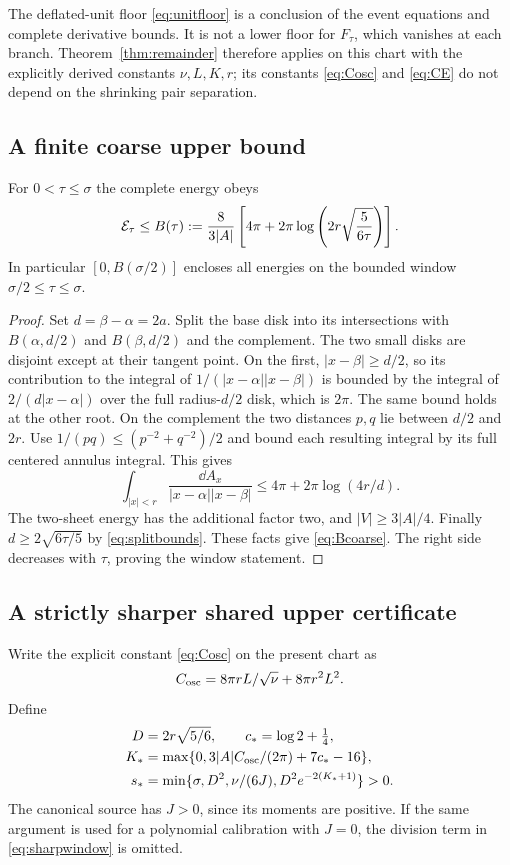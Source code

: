 The deflated-unit floor \eqref{eq:unitfloor} is a conclusion of the
event equations and complete derivative bounds. It is not a lower floor
for $F_\tau$, which vanishes at each branch. Theorem~\ref{thm:remainder}
therefore applies on this chart with the explicitly derived constants
$\nu,L,K,r$; its constants \eqref{eq:Cosc} and \eqref{eq:CE} do not
depend on the shrinking pair separation.

\subsection{A finite coarse upper bound}
\begin{proposition}\label{prop:coarseheat}
For $0<\tau\leq\sigma$ the complete energy obeys
\begin{equation}\label{eq:Bcoarse}
 \mathcal E_\tau\leq B(\tau):=
 \frac8{3|A|}\left[4\pi+2\pi\log\left(
                   2r\sqrt{\frac5{6\tau}}\right)\right].
\end{equation}
In particular $[0,B(\sigma/2)]$ encloses all energies on the bounded
window $\sigma/2\leq\tau\leq\sigma$.
\end{proposition}
\begin{proof}
Set $d=\beta-\alpha=2a$. Split the base disk into its intersections
with $B(\alpha,d/2)$ and $B(\beta,d/2)$ and the complement. The two
small disks are disjoint except at their tangent point. On the first,
$|x-\beta|\geq d/2$, so its contribution to the integral of
$1/(|x-\alpha||x-\beta|)$ is bounded by the integral of
$2/(d|x-\alpha|)$ over the full radius-$d/2$ disk, which is $2\pi$.
The same bound holds at the other root. On the complement the two
distances $p,q$ lie between $d/2$ and $2r$. Use
$1/(pq)\leq(p^{-2}+q^{-2})/2$ and bound each resulting integral by
its full centered annulus integral. This gives
\[
 \int_{|x|<r}\frac{\dd A_x}{|x-\alpha||x-\beta|}
                  \leq4\pi+2\pi\log(4r/d).
\]
The two-sheet energy has the additional factor two, and
$|V|\geq3|A|/4$. Finally $d\geq2\sqrt{6\tau/5}$ by
\eqref{eq:splitbounds}. These facts give \eqref{eq:Bcoarse}.
The right side decreases with $\tau$, proving the window statement.
\end{proof}

\subsection{A strictly sharper shared upper certificate}
Write the explicit constant \eqref{eq:Cosc} on the present chart as
\begin{equation}\label{eq:heatCosc}
 C_{\mathrm{osc}}=8\pi rL/\sqrt\nu+8\pi r^2L^2.
\end{equation}
Define
\begin{align}
 D&=2r\sqrt{5/6},\qquad c_*=\log2+\tfrac14,\label{eq:sharpD}\\
 K_*&=\max\{0,3|A|C_{\mathrm{osc}}/(2\pi)+7c_*-16\},\label{eq:sharpK}\\
 s_*&=\min\{\sigma,D^2,\nu/(6J),D^2e^{-2(K_*+1)}\}>0.
 \label{eq:sharpwindow}
\end{align}
The canonical source has $J>0$, since its moments are positive. If the
same argument is used for a polynomial calibration with $J=0$, the
division term in \eqref{eq:sharpwindow} is omitted.

